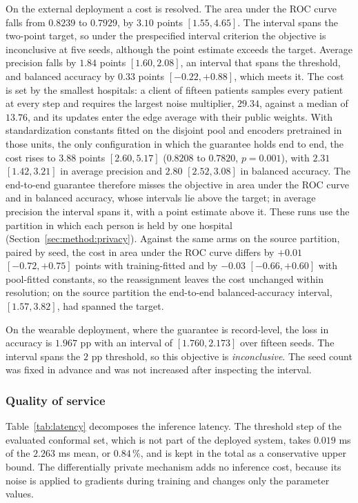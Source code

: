 On the external deployment a cost is resolved. The area under the ROC curve
falls from $0.8239$ to $0.7929$, by $3.10$ points $[1.55, 4.65]$. The interval
spans the two-point target, so under the prespecified interval criterion the
objective is inconclusive at five seeds, although the point estimate exceeds
the target. Average precision falls by
$1.84$ points $[1.60, 2.08]$, an interval that spans the threshold, and
balanced accuracy by $0.33$ points $[-0.22, +0.88]$, which meets it. The cost
is set by the smallest hospitals: a client of fifteen patients samples every
patient at every step and requires the largest noise multiplier, $29.34$,
against a median of $13.76$, and its updates enter the edge average with their
public weights. With standardization constants fitted on the disjoint pool and encoders
pretrained in those units, the only configuration in which the guarantee holds
end to end, the cost rises to $3.88$ points $[2.60, 5.17]$ ($0.8208$ to
$0.7820$, $p = 0.001$), with $2.31$ $[1.42, 3.21]$ in average precision and
$2.80$ $[2.52, 3.08]$ in balanced accuracy. The end-to-end guarantee therefore
misses the objective in area under the ROC curve and in balanced accuracy,
whose intervals lie above the target; in average precision the interval spans
it, with a point estimate above it. These runs use the partition in which each
person is held by one hospital (Section~\ref{sec:method:privacy}). Against the
same arms on the source partition, paired by seed, the cost in area under the
ROC curve differs by $+0.01$ $[-0.72, +0.75]$ points with training-fitted and
by $-0.03$ $[-0.66, +0.60]$ with pool-fitted constants, so the reassignment
leaves the cost unchanged within resolution; on the source partition the
end-to-end balanced-accuracy interval, $[1.57, 3.82]$, had spanned the
target.

On the wearable deployment, where the guarantee is record-level, the loss in
accuracy is $1.967$ pp with an interval of $[1.760, 2.173]$ over fifteen seeds.
The interval spans the $2$ pp threshold, so this objective is
\emph{inconclusive}. The seed count was fixed in advance and was not increased
after inspecting the interval.

\subsubsection{Quality of service}
Table~\ref{tab:latency} decomposes the inference latency. The threshold step
of the evaluated conformal set, which is not part of the deployed system,
takes $0.019$ ms of the $2.263$ ms mean, or $0.84\,\%$, and is kept in the
total as a conservative upper bound. The differentially private mechanism adds
no inference cost, because its noise is applied to gradients during training
and changes only the parameter values.

